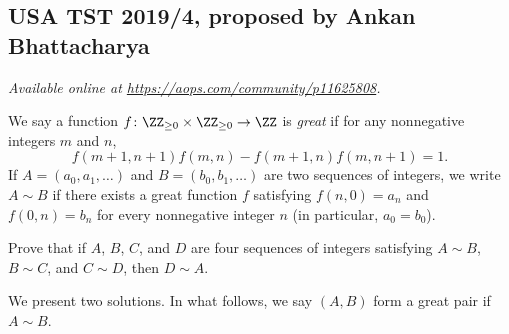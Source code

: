 \documentclass[11pt]{scrartcl}
\begin{document}
\subsection{USA TST 2019/4, proposed by Ankan Bhattacharya}
\textsl{Available online at \url{https://aops.com/community/p11625808}.}
\begin{mdframed}[style=mdpurplebox,frametitle={Problem statement}]
We say a function $f \colon \ZZ_{\ge 0} \times \ZZ_{\ge 0} \to \ZZ$
is \emph{great} if for any nonnegative integers $m$ and $n$,
\[ f(m+1, n+1) f(m,n) - f(m+1,n) f(m,n+1) = 1. \]
If $A = (a_0, a_1, \dots)$ and $B = (b_0, b_1, \dots)$
are two sequences of integers,
we write $A \sim B$ if there exists a great function $f$
satisfying $f(n,0) = a_n$ and $f(0,n) = b_n$
for every nonnegative integer $n$ (in particular, $a_0=b_0$).

Prove that if $A$, $B$, $C$, and $D$ are four sequences of integers
satisfying $A \sim B$, $B \sim C$, and $C \sim D$, then $D \sim A$.
\end{mdframed}
We present two solutions.
In what follows, we say $(A, B)$ form a great pair
if $A \sim B$.
\end{document}
